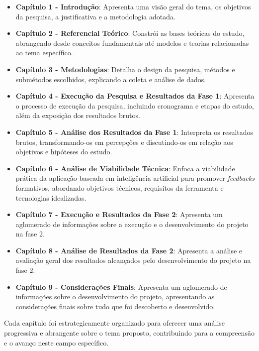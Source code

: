 \begin{itemize}
    \item \textbf{Capítulo 1 - Introdução}: Apresenta uma visão geral do tema, os objetivos da pesquisa, a justificativa e a metodologia adotada.
    
    \item \textbf{Capítulo 2 - Referencial Teórico}: Constrói as bases teóricas do estudo, abrangendo desde conceitos fundamentais até modelos e teorias relacionadas ao tema específico.
    
    \item \textbf{Capítulo 3 - Metodologias}: Detalha o design da pesquisa, métodos e submétodos escolhidos, explicando a coleta e análise de dados.
    
    \item \textbf{Capítulo 4 - Execução da Pesquisa e Resultados da Fase 1}: Apresenta o processo de execução da pesquisa, incluindo cronograma e etapas do estudo, além da exposição dos resultados brutos.
    
    \item \textbf{Capítulo 5 - Análise dos Resultados da Fase 1}: Interpreta os resultados brutos, transformando-os em percepções e discutindo-os em relação aos objetivos e hipóteses do estudo.
    
    \item \textbf{Capítulo 6 - Análise de Viabilidade Técnica}: Enfoca a viabilidade prática da aplicação baseada em inteligência artificial para promover \textit{feedbacks} formativos, abordando objetivos técnicos, requisitos da ferramenta e tecnologias idealizadas.
    
    \item \textbf{Capítulo 7 - Execução e Resultados da Fase 2}: Apresenta um aglomerado de informações sobre a execução e o desenvolvimento do projeto na fase 2.

    \item \textbf{Capítulo 8 - Análise de Resultados da Fase 2}: Apresenta a análise e avaliação geral dos resultados alcançados pelo desenvolvimento do projeto na fase 2.

    \item \textbf{Capítulo 9 - Considerações Finais}: Apresenta um aglomerado de informações sobre o desenvolvimento do projeto, apresentando as considerações finais sobre tudo que foi descoberto e desenvolvido.
\end{itemize}

Cada capítulo foi estrategicamente organizado para oferecer uma análise progressiva e abrangente sobre o tema proposto, contribuindo para a compreensão e o avanço neste campo específico.

